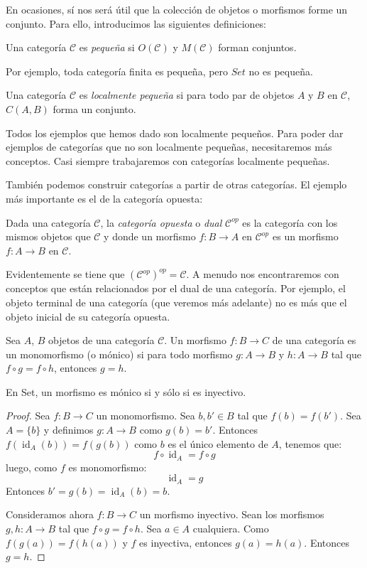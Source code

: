 \documentclass[12pt, twoside]{book}
\newcommand{\cat}{{\mathcal{C}}}
\newcommand{\Set}{{Set}}
\DeclareMathOperator{\id}{id}
\begin{document}
En ocasiones, sí nos será útil que la colección de objetos o morfismos forme un conjunto.
Para ello, introducimos las siguientes definiciones:

\begin{definition}
Una categoría $\cat$ es \emph{pequeña} si $O(\cat)$ y $M(\cat)$ forman conjuntos.
\end{definition}

Por ejemplo, toda categoría finita es pequeña, pero $\Set$ no es pequeña.

\begin{definition}
Una categoría $\cat$ es \emph{localmente pequeña} si para todo par de objetos $A$ y $B$ en $\cat$, $C(A,B)$ forma un conjunto.
\end{definition}

Todos los ejemplos que hemos dado son localmente pequeños.
Para poder dar ejemplos de categorías que no son localmente pequeñas, necesitaremos más conceptos.
Casi siempre trabajaremos con categorías localmente pequeñas.

También podemos construir categorías a partir de otras categorías.
El ejemplo más importante es el de la categoría opuesta:
\begin{definition}
Dada una categoría $\cat$, la \emph{categoría opuesta} o \emph{dual} $\cat^{op}$ es la categoría con los mismos objetos que $\cat$ y donde un morfismo $f \colon B \to A$ en $\cat^{op}$ es un morfismo $f \colon A \to B$ en $\cat$.
\end{definition}

Evidentemente se tiene que $\left(\cat^{op}\right)^{op} = \cat$.
A menudo nos encontraremos con conceptos que están relacionados por el dual de una categoría.
Por ejemplo, el objeto terminal de una categoría (que veremos más adelante) no es más que el objeto inicial de su categoría opuesta.

\begin{definition}
Sea $A$, $B$ objetos de una categoría $\cat$.
Un morfismo $f \colon B \to C$ de una categoría es un monomorfismo (o mónico) si para todo morfismo $g \colon A \to B$ y $h \colon A \to B$ tal que $f \circ g = f \circ h$, entonces $g = h$.
\end{definition}

\begin{proposition}
En \Set, un morfismo es mónico si y sólo si es inyectivo.
\end{proposition}

\begin{proof}
Sea $f \colon B \to C$ un monomorfismo. Sea $b, b' \in B$ tal que $f(b) = f(b')$. Sea $A = \{b\}$ y definimos $g \colon A \to B$ como $g(b)=b'$.
Entonces $f(\id_A(b)) = f(g(b))$
como $b$ es el único elemento de $A$, tenemos que:
\[ f \circ \id_A = f \circ g \]
luego, como $f$ es monomorfismo:
\[ \id_A = g \]
Entonces $b'=g(b)=\id_A(b)=b$.

Consideramos ahora $f \colon B \to C$ un morfismo inyectivo.
Sean los morfismos $g, h \colon A \to B$ tal que $f \circ g = f \circ h$.
Sea $a \in A$ cualquiera. Como $f(g(a)) = f(h(a))$ y $f$ es inyectiva, entonces $g(a) = h(a)$.
Entonces $g = h$. 
\end{proof}
\end{document}
